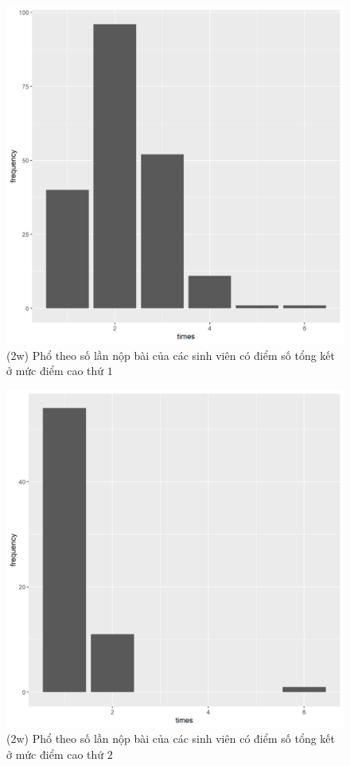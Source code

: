 \documentclass[a4paper]{article}
\theoremstyle{definition}
\begin{document}
\newpage
\begin{figure}[!ht]
    \centering
    \includegraphics[scale=0.4]{Pics/q2w-1-file3.png}
    \caption{(2w) Phổ theo số lần nộp bài của các sinh viên có điểm số tổng kết ở mức điểm cao thứ $1$}
    \label{fig:my_label}
\end{figure}
\begin{figure}[!ht]
    \centering
    \includegraphics[scale=0.4]{Pics/q2w-2-file3.png}
    \caption{(2w) Phổ theo số lần nộp bài của các sinh viên có điểm số tổng kết ở mức điểm cao thứ $2$}
    \label{fig:my_label}
\end{figure}
\end{document}
